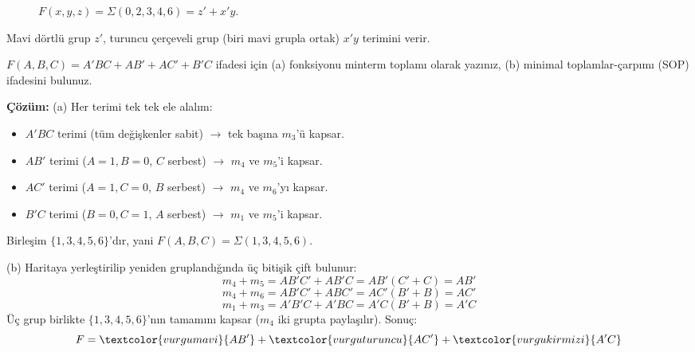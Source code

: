 \begin{figure}[H]
\centering
{}
\caption{$F(x,y,z)=\Sigma(0,2,3,4,6)=z'+x'y$.}
\label{fig:kmap-alistirma3}
\end{figure}
Mavi dörtlü grup $z'$, turuncu çerçeveli grup (biri mavi grupla ortak) $x'y$ terimini verir.

\begin{alistirma}[\zor]
$F(A,B,C)=A'BC+AB'+AC'+B'C$ ifadesi için (a) fonksiyonu minterm toplamı olarak yazınız,
(b) minimal toplamlar-çarpımı (SOP) ifadesini bulunuz.
\end{alistirma}

\noindent\textbf{Çözüm:} (a) Her terimi tek tek ele alalım:
\begin{itemize}[nosep, leftmargin=*]
    \item $A'BC$ terimi (tüm değişkenler sabit) $\to$ tek başına $m_3$'ü kapsar.
    \item $AB'$ terimi ($A=1,B=0$, $C$ serbest) $\to$ $m_4$ ve $m_5$'i kapsar.
    \item $AC'$ terimi ($A=1,C=0$, $B$ serbest) $\to$ $m_4$ ve $m_6$'yı kapsar.
    \item $B'C$ terimi ($B=0,C=1$, $A$ serbest) $\to$ $m_1$ ve $m_5$'i kapsar.
\end{itemize}
Birleşim $\{1,3,4,5,6\}$'dır, yani $F(A,B,C)=\Sigma(1,3,4,5,6)$.

(b) Haritaya yerleştirilip yeniden gruplandığında üç bitişik çift bulunur:
\[
m_4+m_5 = AB'C'+AB'C = AB'(C'+C) = AB'
\]
\[
m_4+m_6 = AB'C'+ABC' = AC'(B'+B) = AC'
\]
\[
m_1+m_3 = A'B'C+A'BC = A'C(B'+B) = A'C
\]
Üç grup birlikte $\{1,3,4,5,6\}$'nın tamamını kapsar ($m_4$ iki grupta paylaşılır).
Sonuç:
\[
F = \textcolor{vurgumavi}{AB'} + \textcolor{vurguturuncu}{AC'} + \textcolor{vurgukirmizi}{A'C}
\]

